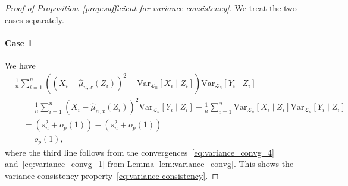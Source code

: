 \documentclass[aos]{imsart}
\theoremstyle{definition}
\theoremstyle{remark}
\newcommand{\V}{\mathrm{Var}}							%
\newcommand{\srx}{X}									%
\newcommand{\srz}{Z}									%
\newcommand{\sry}{Y}									%
\newcommand{\law}{\mathcal L}							%
\begin{document}
\begin{proof}[Proof of Proposition~\ref{prop:sufficient-for-variance-consistency}]

We treat the two cases separately.

\paragraph*{Case 1}
We have
\begin{align*}
&\frac{1}{n} \sum_{i = 1}^n ((\srx_i - \widehat \mu_{n,x}(\srz_i))^2 - \V_{\law_n}[\srx_i \mid \srz_i])\V_{\law_n}[\sry_i\mid\srz_i] \\
&\quad= \frac{1}{n} \sum_{i = 1}^n (\srx_i - \widehat \mu_{n,x}(\srz_i))^2\V_{\law_n}[\sry_i\mid\srz_i] - \frac{1}{n} \sum_{i = 1}^n \V_{\law_n}[\srx_i \mid \srz_i]\V_{\law_n}[\sry_i\mid\srz_i] \\
&\quad= (s^2_n + o_p(1)) - (s^2_n + o_p(1)) \\
&\quad= o_p(1),
\end{align*}
where the third line follows from the convergences~\eqref{eq:variance_convg_4} and~\eqref{eq:variance_convg_1} from Lemma \ref{lem:variance_convg}. This shows the variance consistency property~\eqref{eq:variance-consistency}.


\end{proof}
\end{document}
